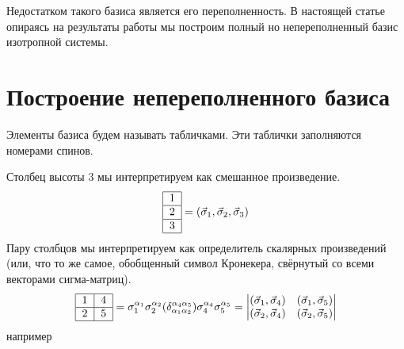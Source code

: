 \documentclass[]{article}
\begin{document}
Недостатком такого базиса является его переполненность.
В настоящей статье опираясь на результаты работы \cite{sourceArticle}
мы построим полный но непереполненный базис изотропной системы.




\section{Построение непереполненного базиса \cite{sourceArticle}}
Элементы базиса будем называть табличками. Эти таблички заполняются номерами спинов.

Столбец высоты 3 мы интерпретируем как смешанное произведение.
$$ \begin{tabular}{ | l | }
\hline
1 \\ \hline
2 \\ \hline
3 \\
\hline
\end{tabular} = (\vec \sigma_1, \vec \sigma_2, \vec \sigma_3) $$
Пару столбцов мы интерпретируем как определитель скалярных произведений (или, что то же самое, обобщенный символ Кронекера\cite{kronecker_wiki}, свёрнутый со всеми векторами сигма-матриц).
$$ \begin{tabular}{ |l|l| }
\hline
1 & 4 \\ \hline
2 & 5\\ 
\hline
\end{tabular}
 =
 \sigma_1^{\alpha_1} \sigma_2^{\alpha_2} 
 (\delta_{\alpha_1\alpha_2}^{\alpha_4\alpha_5})
 \sigma_4^{\alpha_4} \sigma_5^{\alpha_5} 
 =
\begin{vmatrix}
(\vec\sigma_1,\vec\sigma_4) & (\vec\sigma_1,\vec\sigma_5)\\
(\vec\sigma_2,\vec\sigma_4) & (\vec\sigma_2,\vec\sigma_5)\\
\end{vmatrix}
$$
например
\end{document}
